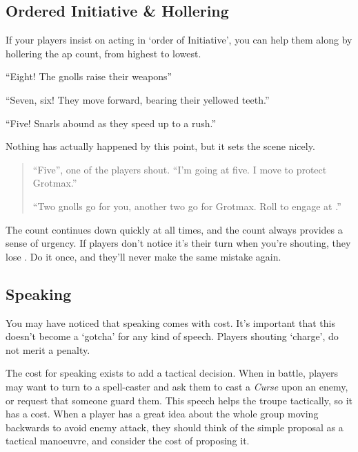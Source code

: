 \begin{multicols}{2}

\subsection{Ordered Initiative \& Hollering}

If your players insist on acting in `order of Initiative', you can help them along by hollering the \gls{ap} count, from highest to lowest.

\begin{exampletext}

``Eight! The gnolls raise their weapons''

``Seven, six! They move forward, bearing their yellowed teeth.''

``Five! Snarls abound as they speed up to a rush.''

\end{exampletext}

Nothing has actually happened by this point, but it sets the scene nicely.

\begin{quote}

  ``Five'', one of the players shout.
  ``I'm going at five.
  I move to protect Grotmax.''

  ``Two gnolls go for you, another two go for Grotmax.
  Roll to engage at \tn[11].''

\end{quote}

The count continues down quickly at all times, and the count always provides a sense of urgency.
If players don't notice it's their turn when you're shouting, they lose .
Do it once, and they'll never make the same mistake again.

\subsection{Speaking}

You may have noticed that speaking comes with  cost.
It's important that this doesn't become a `gotcha' for any kind of speech.
Players shouting `charge', do not merit a penalty.

The cost for speaking exists to add a tactical decision.
When in battle, players may want to turn to a spell-caster and ask them to cast a \textit{Curse} upon an enemy, or request that someone guard them.
This speech helps the troupe tactically, so it has a cost.
When a player has a great idea about the whole group moving backwards to avoid enemy attack, they should think of the simple proposal as a tactical manoeuvre, and consider the cost of proposing it.


\end{multicols}
